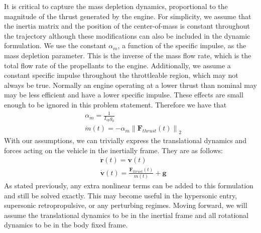 It is critical to capture the mass depletion dynamics, proportional to the magnitude of the thrust generated by the engine. For simplicity, we assume that the inertia matrix and the position of the center-of-mass is constant throughout the trajectory although these modifications can also be included in the dynamic formulation. We use the constant $\alpha_{\dot{m}}$, a function of the specific impulse, as the mass depletion parameter. This is the inverse of the mass flow rate, which is the total flow rate of the propellants to the engine. Additionally, we assume a constant specific impulse throughout the throttleable region, which may not always be true. Normally an engine operating at a lower thrust than nominal may may be less efficient and have a lower specific impulse. These effects are small enough to be ignored in this problem statement. Therefore we have that
% 
\begin{align}
& \alpha_{\dot{m}} = \frac{1}{I_{sp} g_0} \\
& \dot{m}(t) = -\alpha_{\dot{m}} \left\lVert \mathbf{F}_{thrust}(t) \right\rVert _2
\end{align}
% 
With our assumptions, we can trivially express the translational dynamics and forces acting on the vehicle in the inertially frame. They are as follows:
% 
\begin{align}
& \dot{\mathbf{r}}(t) = \mathbf{v}(t) \\
& \dot{\mathbf{v}}(t) = \frac{\mathbf{F}_{thrust}(t)}{m(t)} + \mathbf{g}
\end{align}
As stated previously, any extra nonlinear terms can be added to this formulation and still be solved exactly. This may become useful in the hypersonic entry, supersonic retropropulsive, or any perturbing regimes. Moving forward, we will assume the translational dynamics to be in the inertial frame and all rotational dynamics to be in the body fixed frame.

